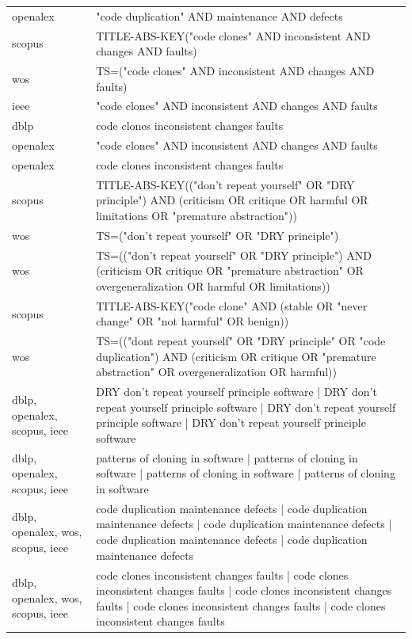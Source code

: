 \documentclass{article}
\begin{document}
\begin{longtable}{lp{10cm}}
openalex & "code duplication" AND maintenance AND defects \\
scopus & TITLE-ABS-KEY("code clones" AND inconsistent AND changes AND faults) \\
wos & TS=("code clones" AND inconsistent AND changes AND faults) \\
ieee & "code clones" AND inconsistent AND changes AND faults \\
dblp & code clones inconsistent changes faults \\
openalex & "code clones" AND inconsistent AND changes AND faults \\
openalex & code clones inconsistent changes faults \\
scopus & TITLE-ABS-KEY(("don't repeat yourself" OR "DRY principle") AND (criticism OR critique OR harmful OR limitations OR "premature abstraction")) \\
wos & TS=("don't repeat yourself" OR "DRY principle") \\
wos & TS=(("don't repeat yourself" OR "DRY principle") AND (criticism OR critique OR "premature abstraction" OR overgeneralization OR harmful OR limitations)) \\
scopus & TITLE-ABS-KEY("code clone" AND (stable OR "never change" OR "not harmful" OR benign)) \\
wos & TS=(("dont repeat yourself" OR "DRY principle" OR "code duplication") AND (criticism OR critique OR "premature abstraction" OR overgeneralization OR harmful)) \\
dblp, openalex, scopus, ieee & DRY don't repeat yourself principle software | DRY don't repeat yourself principle software | DRY don't repeat yourself principle software | DRY don't repeat yourself principle software \\
dblp, openalex, scopus, ieee & patterns of cloning in software | patterns of cloning in software | patterns of cloning in software | patterns of cloning in software \\
dblp, openalex, wos, scopus, ieee & code duplication maintenance defects | code duplication maintenance defects | code duplication maintenance defects | code duplication maintenance defects | code duplication maintenance defects \\
dblp, openalex, wos, scopus, ieee & code clones inconsistent changes faults | code clones inconsistent changes faults | code clones inconsistent changes faults | code clones inconsistent changes faults | code clones inconsistent changes faults \\
\bottomrule
\end{longtable}
\end{document}
